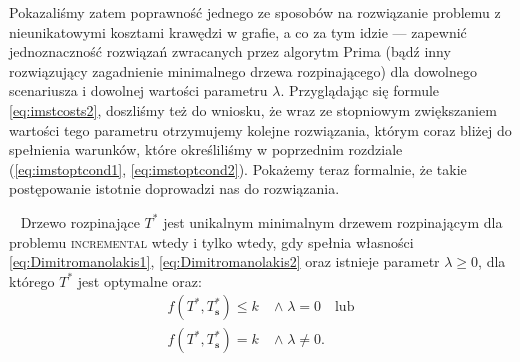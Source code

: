 {Pokazaliśmy zatem poprawność jednego ze sposobów na rozwiązanie problemu z nieunikatowymi kosztami krawędzi w grafie, a co za tym idzie --- zapewnić jednoznaczność rozwiązań zwracanych przez algorytm Prima (bądź inny rozwiązujący zagadnienie minimalnego drzewa rozpinającego) dla dowolnego scenariusza i dowolnej wartości parametru $\lambda$. Przyglądając się formule \ref{eq:imstcosts2}, doszliśmy też do wniosku, że wraz ze stopniowym zwiększaniem wartości tego parametru otrzymujemy kolejne rozwiązania, którym coraz bliżej do spełnienia warunków, które określiliśmy w poprzednim rozdziale (\ref{eq:imstoptcond1}, \ref{eq:imstoptcond2}). Pokażemy teraz formalnie, że takie postępowanie istotnie doprowadzi nas do rozwiązania.

\begin{theorem}~\cite[$589$]{incNetOpt}\label{th:incNetOpt}
	Drzewo rozpinające $T^{\ast}$ jest unikalnym minimalnym drzewem rozpinającym dla problemu \textsc{incremental} wtedy i tylko wtedy, gdy spełnia własności \ref{eq:Dimitromanolakis1}, \ref{eq:Dimitromanolakis2} oraz istnieje parametr $\lambda \geqslant 0$, dla którego $T^{\ast}$ jest optymalne oraz:
	\begin{align}
		f \left( T^{\ast}, T^{\ast}_{\textbf{s}} \right) \leqslant k \; & \wedge \; \lambda = 0 \quad \text{lub}\label{eq:imstoptcond3}\\
		f \left( T^{\ast}, T^{\ast}_{\textbf{s}} \right) = k \; & \wedge \; \lambda \neq 0\text{.}\label{eq:imstoptcond4}
	\end{align}
\end{theorem}

}
